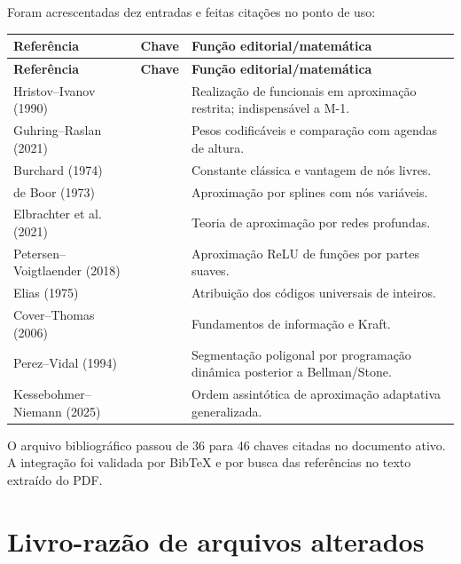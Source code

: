 \documentclass[11pt,a4paper]{article}
\begin{document}
Foram acrescentadas dez entradas e feitas citações no ponto de uso:

\begin{longtable}{L{0.21\textwidth}L{0.25\textwidth}L{0.42\textwidth}}
\toprule
\textbf{Referência} & \textbf{Chave} & \textbf{Função editorial/matemática}\\
\midrule
\endfirsthead
\toprule
\textbf{Referência} & \textbf{Chave} & \textbf{Função editorial/matemática}\\
\midrule
\endhead
Hristov--Ivanov (1990) &  & Realização de funcionais em
aproximação restrita; indispensável a M-1.\\
Guhring--Raslan (2021) &  & Pesos codificáveis e comparação
com agendas de altura.\\
Burchard (1974) &  & Constante clássica e vantagem de nós livres.\\
de Boor (1973) &  & Aproximação por splines com nós
variáveis.\\
Elbrachter et al. (2021) &  & Teoria de aproximação por redes
profundas.\\
Petersen--Voigtlaender (2018) &  & Aproximação ReLU de
funções por partes suaves.\\
Elias (1975) &  & Atribuição dos códigos universais de inteiros.\\
Cover--Thomas (2006) &  & Fundamentos de informação e Kraft.\\
Perez--Vidal (1994) &  & Segmentação poligonal por programação
dinâmica posterior a Bellman/Stone.\\
Kessebohmer--Niemann (2025) &  & Ordem assintótica de
aproximação adaptativa generalizada.\\
\bottomrule
\end{longtable}

O arquivo bibliográfico passou de 36 para 46 chaves citadas no documento ativo. A
integração foi validada por BibTeX e por busca das referências no texto extraído do PDF.

\section{Livro-razão de arquivos alterados}
\end{document}

